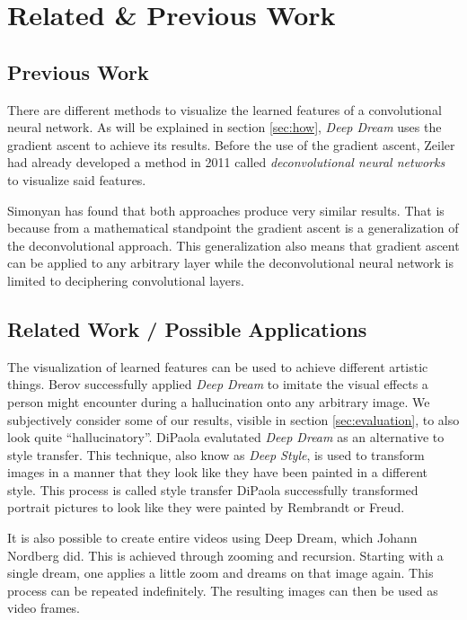 \section{Related \& Previous Work}
\label{sec:previous-work}
\subsection{Previous Work}
There are different methods to visualize the learned features of a convolutional neural network.
As will be explained in section \ref{sec:how}, \textit{Deep Dream} uses the gradient ascent to achieve its results.
Before the use of the gradient ascent, Zeiler had already developed a method in 2011 called \emph{deconvolutional neural networks} to visualize said features.\cite{zeiler2011adaptive}

Simonyan has found that both approaches produce very similar results.
That is because from a mathematical standpoint the gradient ascent is a generalization of the deconvolutional approach.
This generalization also means that gradient ascent can be applied to any arbitrary layer while the deconvolutional neural network is limited to deciphering convolutional layers.\cite{simonyan2013deep}

\subsection{Related Work / Possible Applications}
The visualization of learned features can be used to achieve different artistic things.
Berov successfully applied \textit{Deep Dream} to imitate the visual effects a person might encounter during a hallucination onto any arbitrary image.\cite{berov2016visual}
We subjectively consider some of our results, visible in section \ref{sec:evaluation}, to also look quite \enquote{hallucinatory}.
DiPaola evalutated \textit{Deep Dream} as an alternative to style transfer.
This technique, also know as \emph{Deep Style}, is used to transform images in a manner that they look like they have been painted in a different style.\cite{dipaola2016using}
This process is called style transfer
DiPaola successfully transformed portrait pictures to look like they were painted by Rembrandt or Freud.

It is also possible to create entire videos using Deep Dream, which Johann Nordberg did.\cite{deep-dream-video}
This is achieved through zooming and recursion.
Starting with a single dream, one applies a little zoom and dreams on that image again.
This process can be repeated indefinitely.
The resulting images can then be used as video frames.

